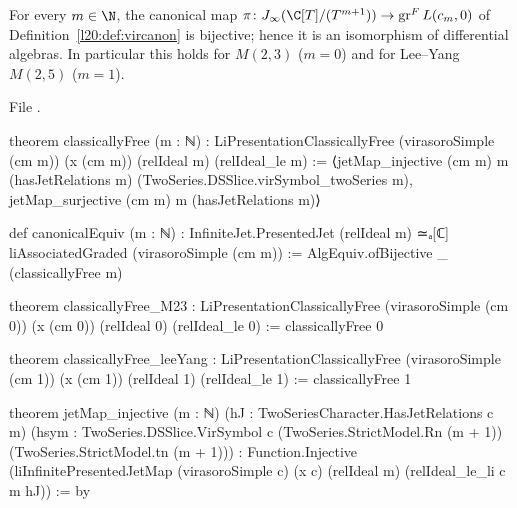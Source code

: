 \begin{theorem}\label{l20:thm:virfree}
For every $m\in\N$, the canonical map $\pi\colon\ltwentyJ(\C[T]/(T^{m+1}))\to\ltwentygr L(c_m,0)$ of
Definition~\ref{l20:def:vircanon} is bijective; hence it is an isomorphism of differential algebras. In particular this holds
for $M(2,3)$ ($m=0$) and for Lee--Yang $M(2,5)$ ($m=1$).
\end{theorem}
\noindent File .
\begin{leancode}
theorem classicallyFree (m : ℕ) :
    LiPresentationClassicallyFree (virasoroSimple (cm m)) (x (cm m)) (relIdeal m)
      (relIdeal_le m) :=
  ⟨jetMap_injective (cm m) m (hasJetRelations m) (TwoSeries.DSSlice.virSymbol_twoSeries m),
    jetMap_surjective (cm m) m (hasJetRelations m)⟩

def canonicalEquiv (m : ℕ) :
    InfiniteJet.PresentedJet (relIdeal m) ≃ₐ[ℂ] liAssociatedGraded (virasoroSimple (cm m)) :=
  AlgEquiv.ofBijective _ (classicallyFree m)

theorem classicallyFree_M23 :
    LiPresentationClassicallyFree (virasoroSimple (cm 0)) (x (cm 0)) (relIdeal 0)
      (relIdeal_le 0) :=
  classicallyFree 0

theorem classicallyFree_leeYang :
    LiPresentationClassicallyFree (virasoroSimple (cm 1)) (x (cm 1)) (relIdeal 1)
      (relIdeal_le 1) :=
  classicallyFree 1

theorem jetMap_injective (m : ℕ) (hJ : TwoSeriesCharacter.HasJetRelations c m)
    (hsym : TwoSeries.DSSlice.VirSymbol c (TwoSeries.StrictModel.Rn (m + 1))
      (TwoSeries.StrictModel.tn (m + 1))) :
    Function.Injective
      (liInfinitePresentedJetMap (virasoroSimple c) (x c) (relIdeal m) (relIdeal_le_li c m hJ)) := by
\end{leancode}

